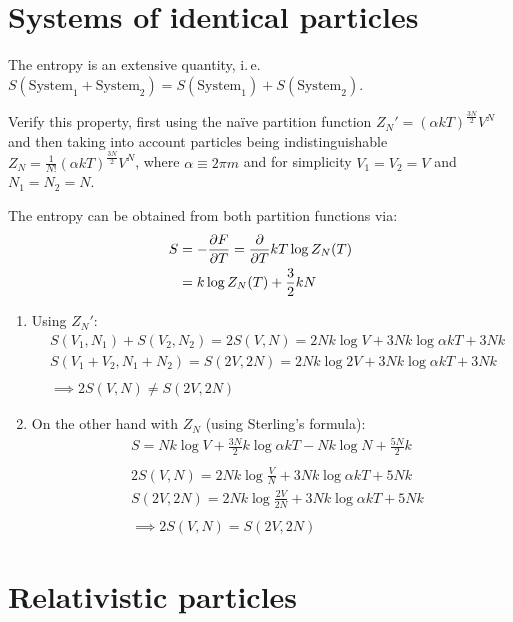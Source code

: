 \documentclass[11pt,a4paper]{scrartcl}
\newcommand{\ie}{i.\,e.}
\begin{document}
\section{Systems of identical particles}

The entropy is an extensive quantity,
\ie~$S(\mathrm{System}_1+\mathrm{System}_2)=S(\mathrm{System}_1)+S(\mathrm{System}_2)$.

Verify this property, first using the na\"ive partition function $Z_N'=(\alpha
kT)^\frac{3N}{2}V^N$ and then taking into account particles being indistinguishable
$Z_N=\frac{1}{N!}(\alpha kT)^\frac{3N}{2}V^N$, where $\alpha\equiv 2\pi m$ and for
simplicity $V_1=V_2=V$ and $N_1=N_2=N$.

The entropy can be obtained from both partition functions via:
\begin{align*}
    S&=-\pdv{F}{T}=\pdv{T}kT\log Z_N(T) \\
    &=k\log Z_N(T)+\frac{3}{2}kN
\end{align*}

\begin{enumerate}[label=\textbf{(\roman*)}]
    \item Using $Z_N'$:
        \begin{align*}
            &S(V_1, N_1)+S(V_2, N_2)=2S(V, N)
            =2Nk\log V+3Nk\log\alpha kT+3Nk \\
            &S(V_1+V_2, N_1+N_2)=S(2V, 2N)
            =2Nk\log 2V +3Nk\log\alpha kT+3Nk \\&\\
            &\implies 2S(V, N)\neq S(2V, 2N)
        \end{align*}

    \item On the other hand with $Z_N$ (using Sterling's formula):
        \begin{align*}
            &S=Nk\log V +\frac{3N}{2}k\log\alpha kT-Nk\log N +\frac{5N}{2}k
            \\&\\
            &2S(V, N)=2Nk\log\frac{V}{N}+3Nk\log\alpha kT+5Nk \\
            &S(2V, 2N)=2Nk\log\frac{2V}{2N}+3Nk\log\alpha kT+5Nk \\&\\
            &\implies \boxed{2S(V, N)=S(2V, 2N)}
        \end{align*}
\end{enumerate}

\newpage

\section{Relativistic particles}
\end{document}
